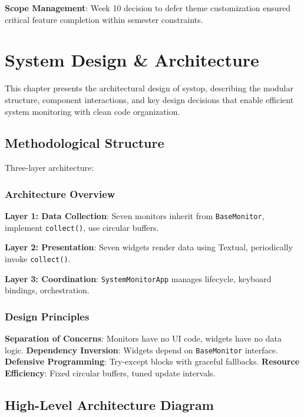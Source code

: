 \documentclass[12pt,a4paper,oneside]{report}
\begin{document}
\textbf{Scope Management}: Week 10 decision to defer theme customization ensured critical feature completion within semester constraints.

\chapter{System Design \& Architecture}
\label{chap:design}

This chapter presents the architectural design of systop, describing the modular structure, component interactions, and key design decisions that enable efficient system monitoring with clean code organization.

\section{Methodological Structure}
\label{sec:methodological-structure}

Three-layer architecture:

\subsection{Architecture Overview}

\textbf{Layer 1: Data Collection}: Seven monitors inherit from \texttt{BaseMonitor}, implement \texttt{collect()}, use circular buffers.

\textbf{Layer 2: Presentation}: Seven widgets render data using Textual, periodically invoke \texttt{collect()}.

\textbf{Layer 3: Coordination}: \texttt{SystemMonitorApp} manages lifecycle, keyboard bindings, orchestration.

\subsection{Design Principles}

\textbf{Separation of Concerns}: Monitors have no UI code, widgets have no data logic. \textbf{Dependency Inversion}: Widgets depend on \texttt{BaseMonitor} interface. \textbf{Defensive Programming}: Try-except blocks with graceful fallbacks. \textbf{Resource Efficiency}: Fixed circular buffers, tuned update intervals.

\section{High-Level Architecture Diagram}
\label{sec:architecture-diagram}
\end{document}
